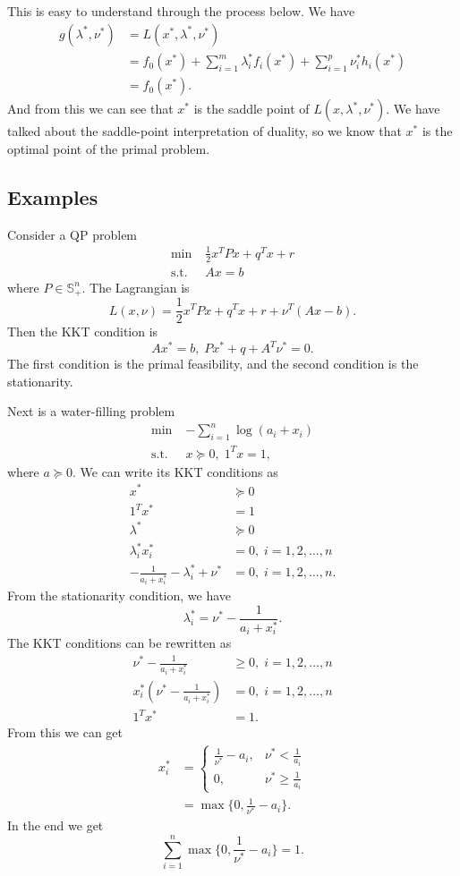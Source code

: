 \documentclass[lang=en,color=blue,mode=fancy,titlestyle=hang]{elegantbook}
\begin{document}
This is easy to understand through the process below. We have
\begin{align*}
g(\lambda^*, \nu^*) &= L(x^*, \lambda^*, \nu^*)\\
&= f_0(x^*) + \sum_{i=1}^m \lambda_i^* f_i(x^*) + \sum_{i=1}^p \nu_i^* h_i(x^*)\\
&= f_0(x^*).
\end{align*}
And from this we can see that $x^*$ is the saddle point of $L(x, \lambda^*, \nu^*)$. We have
talked about the saddle-point interpretation of duality, so we know that $x^*$ is the
optimal point of the primal problem.

\subsection{Examples}
Consider a QP problem
\begin{align*}
\min \; &\frac12 x^T P x + q^T x + r\\
\text{s.t.} \; &Ax = b
\end{align*}
where $P \in \mathbb{S}^n_+$. The Lagrangian is
\[
L(x, \nu) = \frac12 x^T P x + q^T x + r + \nu^T (Ax - b).
\]
Then the KKT condition is
\[
Ax^* = b, \; P x^* + q + A^T \nu^* = 0.
\]
The first condition is the primal feasibility, and the second condition is the stationarity.

Next is a water-filling problem
\begin{align*}
\min \; &-\sum_{i=1}^n \log(a_i + x_i)\\
\text{s.t.} \; &x \succeq 0, \; 1^T x = 1,
\end{align*}
where $a \succeq 0$. We can write its KKT conditions as
\begin{align*}
x^* &\succeq 0\\
1^T x^* &= 1\\
\lambda^* &\succeq 0\\
\lambda_i^* x_i^* &= 0, \; i = 1, 2, \ldots, n\\
- \frac{1}{a_i + x_i^*} - \lambda_i^* + \nu^* &= 0, \; i = 1, 2, \ldots, n.
\end{align*}
From the stationarity condition, we have
\[
\lambda_i^* = \nu^* - \frac{1}{a_i + x_i^*}.
\]
The KKT conditions can be rewritten as
\begin{align*}
\nu^* - \frac{1}{a_i + x_i^*} &\geq 0, \; i = 1, 2, \ldots, n\\
x_i^*(\nu^* - \frac{1}{a_i + x_i^*}) &= 0, \; i = 1, 2, \ldots, n\\
1^T x^* &= 1.
\end{align*}
From this we can get
\begin{align*}
x_i^* &= \begin{cases}
\frac{1}{\nu^*} - a_i, & \nu^* < \frac{1}{a_i}\\
0, & \nu^* \geq \frac{1}{a_i}
\end{cases}\\
&= \max\{0, \frac{1}{\nu^*} - a_i\}.
\end{align*}
In the end we get
\[
\sum_{i=1}^n \max\{0, \frac{1}{\nu^*} - a_i\} = 1.
\]
\end{document}
